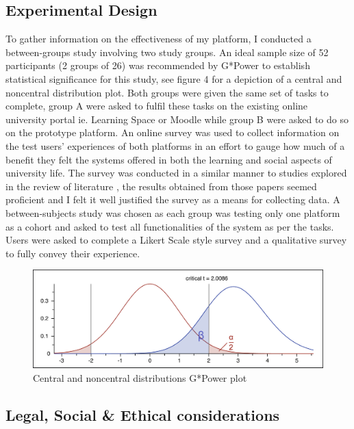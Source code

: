 \documentclass[lettersize,journal]{IEEEtran}
\begin{document}
        \subsection{Experimental Design}
        To gather information on the effectiveness of my platform, I conducted a between-groups study involving
	two study groups. An ideal sample size of 52 participants (2 groups of 26) was recommended by G*Power to establish statistical significance for this study, see figure 4 for a depiction of a
	central and noncentral distribution plot. Both groups were given the same set of tasks to complete, group A were asked to fulfil
        these tasks on the existing online university portal ie. Learning Space or Moodle while group B were asked to 
        do so on the prototype platform. An online survey was used to collect information on the test users' experiences
        of both platforms in an effort to gauge how much of a benefit they felt the systems offered in both the
        learning and social aspects of university life. The survey was conducted in a similar manner to
        studies explored in the review of literature \cite{Liu2010}\cite{Baruah2012}\cite{Wang2011}\cite{Evans2014}\cite{Akram et al 2017},
        the results obtained from those papers seemed proficient and I felt it well justified the survey as a means for collecting data.
        A between-subjects study was chosen as each group was testing only one platform as a cohort and asked to test all functionalities of
        the system as per the tasks. Users were asked to complete a Likert Scale style survey and a qualitative survey to fully convey their experience.
	        \begin{figure}[h!]
                \includegraphics[width=\linewidth]{images/gpowerplot.png}
                \caption{Central and noncentral distributions G*Power plot}
                \label{figure 3}
        \end{figure}
	\subsection{Legal, Social \& Ethical considerations}
\end{document}
